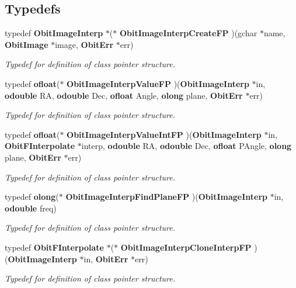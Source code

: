 \subsection*{Typedefs}
\begin{CompactItemize}
\item 
typedef {\bf Obit\-Image\-Interp} $\ast$($\ast$ {\bf Obit\-Image\-Interp\-Create\-FP} )(gchar $\ast$name, {\bf Obit\-Image} $\ast$image, {\bf Obit\-Err} $\ast$err)
\begin{CompactList}\small\item\em Typedef for definition of class pointer structure. \item\end{CompactList}\item 
typedef {\bf ofloat}($\ast$ {\bf Obit\-Image\-Interp\-Value\-FP} )({\bf Obit\-Image\-Interp} $\ast$in, {\bf odouble} RA, {\bf odouble} Dec, {\bf ofloat} Angle, {\bf olong} plane, {\bf Obit\-Err} $\ast$err)
\begin{CompactList}\small\item\em Typedef for definition of class pointer structure. \item\end{CompactList}\item 
typedef {\bf ofloat}($\ast$ {\bf Obit\-Image\-Interp\-Value\-Int\-FP} )({\bf Obit\-Image\-Interp} $\ast$in, {\bf Obit\-FInterpolate} $\ast$interp, {\bf odouble} RA, {\bf odouble} Dec, {\bf ofloat} PAngle, {\bf olong} plane, {\bf Obit\-Err} $\ast$err)
\begin{CompactList}\small\item\em Typedef for definition of class pointer structure. \item\end{CompactList}\item 
typedef {\bf olong}($\ast$ {\bf Obit\-Image\-Interp\-Find\-Plane\-FP} )({\bf Obit\-Image\-Interp} $\ast$in, {\bf odouble} freq)
\begin{CompactList}\small\item\em Typedef for definition of class pointer structure. \item\end{CompactList}\item 
typedef {\bf Obit\-FInterpolate} $\ast$($\ast$ {\bf Obit\-Image\-Interp\-Clone\-Interp\-FP} )({\bf Obit\-Image\-Interp} $\ast$in, {\bf Obit\-Err} $\ast$err)
\begin{CompactList}\small\item\em Typedef for definition of class pointer structure. \item\end{CompactList}\end{CompactItemize}
